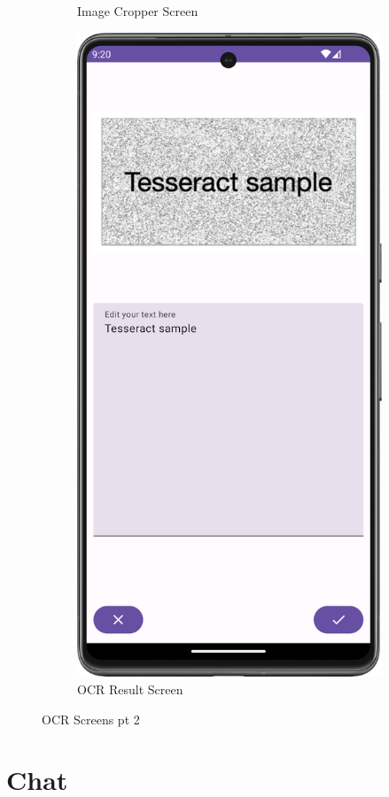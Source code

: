 \begin{figure}[H]
\begin{subfigure}[b]{0.3\textwidth}
    \caption{Image Cropper Screen}
    \label{fig:image_crop}
  \end{subfigure}
  \hfill
  \begin{subfigure}[b]{0.3\textwidth}
    \includegraphics[width=\textwidth]{Figures/Product_Images/OCR/image_result.png}
    \caption{OCR Result Screen}
    \label{fig:image_result}
  \end{subfigure}
  \caption{OCR Screens pt 2}
  \label{fig:OCR_screens_2}
\end{figure}

\section{Chat}

